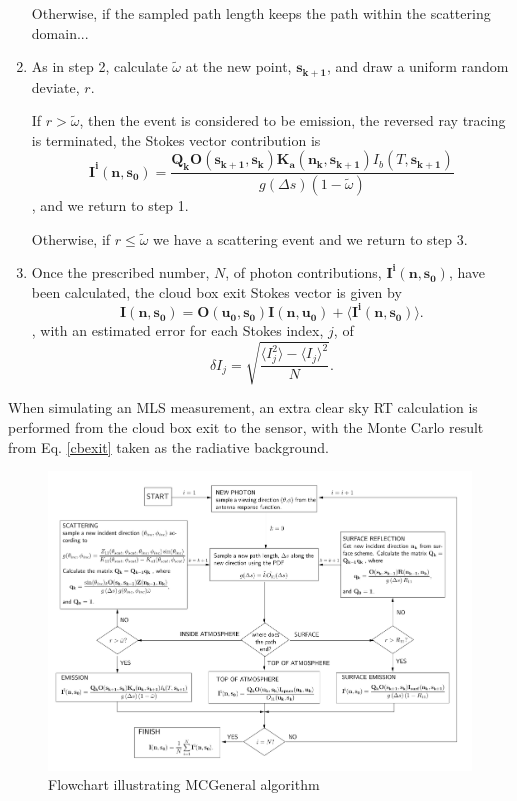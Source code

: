 \begin{enumerate}
Otherwise, if the sampled path length keeps the path within the
scattering domain...
\item
As in step 2, calculate 
$\tilde{\omega}$ at the new point, $\mathbf{s_{k+1}}$, and draw a uniform
  random deviate, $r$.

If $r>\tilde{\omega}$, then the event is considered to be emission,
the reversed ray tracing is terminated, the Stokes vector contribution is
\begin{equation}
\mathbf{I^i(n,s_0)}=\frac{\mathbf{Q_k O(s_{k+1},s_k)}
  \mathbf{K_a(n_k,s_{k+1})} I_b(T,\mathbf{s_{k+1}})}
  {g\left(\Delta s\right)\left(1-\tilde{\omega}\right)}
\label{Iemission3}
\end{equation}
, and we return to step 1.

Otherwise, if $r\le\tilde{\omega}$
we have a scattering event and we return to step 3.
\item
Once the prescribed number, $N$,  of photon contributions,
$\mathbf{I^i(n,s_0)}$, have been calculated, the cloud box exit Stokes
vector is given by
\begin{equation}
\mathbf{I(n,s_0)}=\mathbf{O(u_0,s_0)I(n,u_0)}+\langle\mathbf{I^i(n,s_0)}\rangle.
\label{cbexit}
\end{equation}
, with an estimated error for each Stokes index, $j$,  of
\begin{equation}
\delta I_j=\sqrt{\frac{\langle I_j^2\rangle-\langle I_j\rangle^2}{N}}.
\label{error}
\end{equation}
\end{enumerate}
When simulating an MLS measurement, an extra clear sky RT calculation
is performed from the cloud box exit to the sensor, with the Monte
Carlo result from Eq. \ref{cbexit} taken as the radiative background.

\begin{figure}
\begin{center}
\includegraphics[width=\vsize,angle=90]{flowchart2}
\caption{Flowchart illustrating MCGeneral algorithm}
\end{center}
\label{fig:montecarlo:flowchart}
\end{figure}

 

